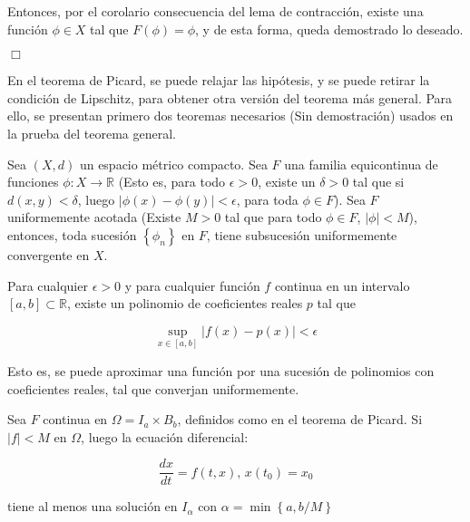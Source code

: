Entonces, por el corolario consecuencia del lema de contracción, existe una función $\phi \in X$ tal que $F(\phi) = \phi$, y de esta forma, queda demostrado lo deseado.



\begin{flushright}
	$\Box$
\end{flushright}

En el teorema de Picard, se puede relajar las hipótesis, y se puede retirar la condición de Lipschitz, para obtener otra versión del teorema más general. Para ello, se presentan primero dos teoremas necesarios (Sin demostración) usados en la prueba del teorema general.

\begin{theorem}
	Sea $(X, d)$ un espacio métrico compacto. Sea $F$ una familia equicontinua de funciones $\phi: X \rightarrow \mathbb{R}$ (Esto es, para todo $\epsilon > 0$, existe un $\delta > 0$ tal que si $d(x, y) < \delta$, luego $\lvert \phi(x) - \phi(y) \rvert < \epsilon$, para toda $\phi \in F$). Sea $F$ uniformemente acotada (Existe $M > 0$ tal que para todo $\phi \in F$, $\lvert \phi \rvert < M$), entonces, toda sucesión $\left\{ \phi_n \right\}$ en $F$, tiene subsucesión uniformemente convergente en $X$.
\end{theorem}

\begin{theorem}
	Para cualquier $\epsilon > 0$ y para cualquier función $f$ continua en un intervalo $[a,b] \subset \mathbb{R}$, existe un polinomio de coeficientes reales $p$ tal que

	\[
		\sup_{x \in [a,b]} \lvert f(x) - p(x) \rvert < \epsilon	
	\]
\end{theorem}

Esto es, se puede aproximar una función por una sucesión de polinomios con coeficientes reales, tal que converjan uniformemente.

\begin{theorem}
	Sea $F$ continua en $\Omega = I_a \times B_b$, definidos como en el teorema de Picard. Si $\lvert f \rvert < M$ en $\Omega$, luego la ecuación diferencial:

	\[
		\frac{dx}{dt} = f(t, x) \text{, } x(t_0) = x_0
	\]

tiene al menos una solución en $I_{\alpha}$ con $\alpha = \min \left\{ a, b/M \right\}$

\end{theorem}

